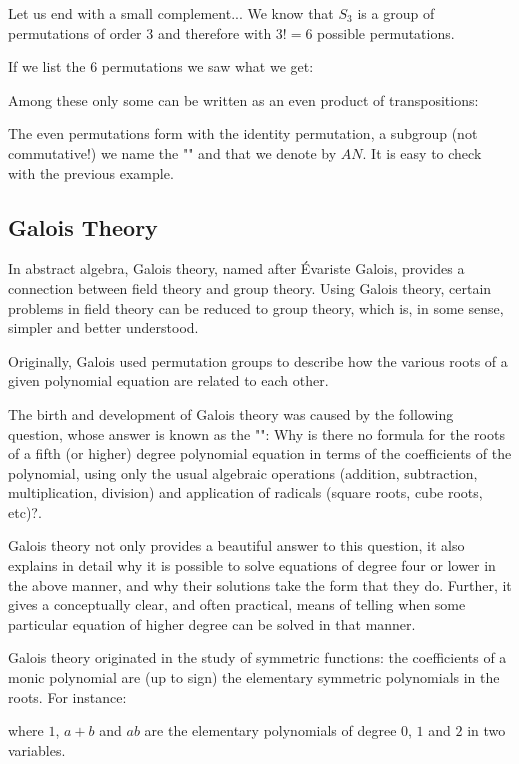 	Let us end with a small complement... We know that $S_3$ is a group of permutations of order $3$ and therefore with $3!=6$ possible permutations.
	
	If we list the $6$ permutations we saw what we get:
	
	Among these only some can be written as an even product of transpositions:
	
	The even permutations form with the identity permutation, a subgroup (not commutative!) we name the "" and that we denote by $AN$. It is easy to check with the previous example.
		
	\subsection{Galois Theory}	
	In abstract algebra, Galois theory, named after Évariste Galois, provides a connection between field theory and group theory. Using Galois theory, certain problems in field theory can be reduced to group theory, which is, in some sense, simpler and better understood.
	
	Originally, Galois used permutation groups to describe how the various roots of a given polynomial equation are related to each other. 
	
	The birth and development of Galois theory was caused by the following question, whose answer is known as the "": Why is there no formula for the roots of a fifth (or higher) degree polynomial equation in terms of the coefficients of the polynomial, using only the usual algebraic operations (addition, subtraction, multiplication, division) and application of radicals (square roots, cube roots, etc)?.
	
	Galois theory not only provides a beautiful answer to this question, it also explains in detail why it is possible to solve equations of degree four or lower in the above manner, and why their solutions take the form that they do. Further, it gives a conceptually clear, and often practical, means of telling when some particular equation of higher degree can be solved in that manner.
	
	Galois theory originated in the study of symmetric functions:  the coefficients of a monic polynomial are (up to sign) the elementary symmetric polynomials in the roots. For instance:
	
 	where $1$, $a + b$ and $ab$ are the elementary polynomials of degree $0$, $1$ and $2$ in two variables.
 	
